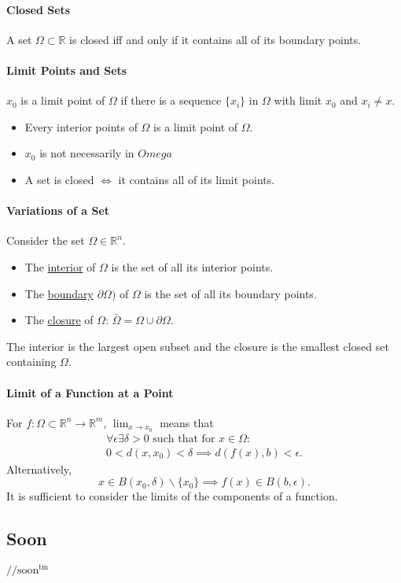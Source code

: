 \documentclass[12pt, letterpaper]{article}
\begin{document}
    \paragraph{Closed Sets}
    A set \(\Omega \subset \mathbb{R}\) is closed iff and only if it contains all of its boundary points.

    \paragraph{Limit Points and Sets}
    \(x_0\) is a limit point of \(\Omega\) if there is a sequence \(\{x_i\}\) 
    in \(\Omega\) with limit \(x_0\) and \(x_i \neq x\).

    \begin{itemize}
        \item Every interior points of \(\Omega\) is a limit point of \(\Omega\).
        \item \(x_0\) is not necessarily in \(Omega\)
        \item A set is closed \(\Leftrightarrow\) it contains all of its limit points.
    \end{itemize}
    
    \paragraph{Variations of a Set}
    Consider the set \(\Omega \in \mathbb{R}^n\).
    \begin{itemize}
        \item The \underline{interior} of \(\Omega\) is the set of all its interior points.
        \item The \underline{boundary} \(\partial \Omega)\) of \(\Omega\) is the set of all its boundary points.
        \item The \underline{closure} of \(\Omega\): \(\bar{\Omega} = \Omega \cup \partial \Omega\).
    \end{itemize}
    The interior is the largest open subset and the closure is the smallest closed set containing \(\Omega\).

    \paragraph{Limit of a Function at a Point}
    For \(f: \Omega \subset \mathbb{R}^n \to \mathbb{R}^m\), 
    \(\lim_{x\to x_0}\) means that 
    \begin{align*}
        \forall \epsilon \exists \delta > 0\text{ such that for } x\in\Omega: \\
        0 < d(x, x_0) < \delta \implies d(f(x), b) < \epsilon.
    \end{align*}
    Alternatively,
    \[
        x\in B(x_0, \delta) \backslash \{x_0\}
        \implies f(x)\in B(b, \epsilon).
    \]
    It is sufficient to consider the limits of the components of a function.

    
    
    
    \subsection{Soon}
    \(//\text{soon}^\text{tm}\)
\end{document}

